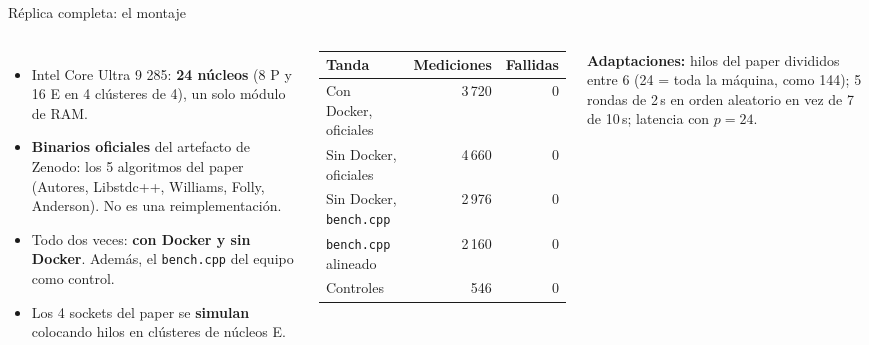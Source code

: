 \providecommand{\rutareplica}{replica/resultados/david-ultra9-285/figuras}
\providecommand{\veces}{\texttimes}

\begin{frame}{Réplica completa: el montaje}
  \begin{columns}[T]
    \small
    \begin{itemize}
      \item Intel Core Ultra 9 285: \textbf{24 núcleos} (8 P y 16 E en 4 clústeres de 4), un solo módulo de RAM.
      \item \textbf{Binarios oficiales} del artefacto de Zenodo: los 5 algoritmos del paper (Autores, Libstdc++, Williams, Folly, Anderson). No es una reimplementación.
      \item Todo dos veces: \textbf{con Docker y sin Docker}. Además, el \texttt{bench.cpp} del equipo como control.
      \item Los 4 sockets del paper se \textbf{simulan} colocando hilos en clústeres de núcleos E.
    \end{itemize}
    \footnotesize
    \renewcommand{\arraystretch}{1.1}
    \begin{tabular}{@{}lrr@{}}
      \toprule
      Tanda & Mediciones & Fallidas\\
      \midrule
      Con Docker, oficiales & 3\,720 & 0\\
      Sin Docker, oficiales & 4\,660 & 0\\
      Sin Docker, \texttt{bench.cpp} & 2\,976 & 0\\
      \texttt{bench.cpp} alineado & 2\,160 & 0\\
      Controles & 546 & 0\\
      \bottomrule
    \end{tabular}
    \par\medskip
    \textbf{Adaptaciones:} hilos del paper divididos entre 6 (24 = toda la máquina, como 144); 5 rondas de 2\,s en orden aleatorio en vez de 7 de 10\,s; latencia con $p = 24$.
  \end{columns}
\end{frame}

